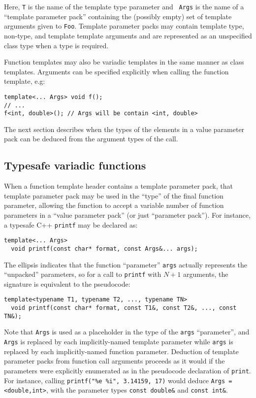 \documentclass{article}
\begin{document}
\noindent
Here, {\tt T} is the name of the template type parameter and {\tt
  Args} is the name of a ``template parameter pack'' containing the
(possibly empty) set of template arguments given to {\tt Foo}.
Template parameter packs may contain template type, non-type, and
template template arguments and are represented as an unspecified
class type when a type is required.

Function templates may also be variadic templates in the same manner
as class templates.  Arguments can be specified explicitly when
calling the function template, e.g:

\begin{verbatim}
template<... Args> void f();
// ... 
f<int, double>(); // Args will be contain <int, double>
\end{verbatim}
The next section describes when the types of the elements in 
a value parameter pack can be deduced from the argument types
of the call. 

\subsection{Typesafe variadic functions}
When a function template header contains a template parameter pack,
that template parameter pack may be used in the ``type'' of the final
function parameter, allowing the function to accept a variable number
of function parameters in a ``value parameter pack'' (or just
``parameter pack''). For instance, a typesafe C++ {\tt printf} may
be declared as:
\begin{verbatim}
template<... Args>
  void printf(const char* format, const Args&... args);
\end{verbatim}

\noindent The ellipsis indicates that the function ``parameter''
\texttt{args}
actually represents the ``unpacked'' parameters, so for a call to
\texttt{printf} with $N+1$ arguments, the signature is equivalent to
the pseudocode:

\begin{verbatim}
template<typename T1, typename T2, ..., typename TN>
  void printf(const char* format, const T1&, const T2&, ..., const TN&);
\end{verbatim}

\noindent 
Note that \texttt{Args} is used as a placeholder in the type of the
\texttt{args} ``parameter'', and \texttt{Args} is replaced by each
implicitly-named template parameter while \texttt{args} is replaced by
each implicitly-named function parameter. Deduction of template
parameter packs from function call arguments proceeds as it would if
the parameters were explicitly enumerated as in the pseudocode
declaration of \texttt{print}. For instance, calling
\texttt{printf("\%e \%i", 3.14159, 17)} would deduce \texttt{Args =
  <double,int>}, with the parameter types \texttt{const double\&} and
\texttt{const int\&}.
\end{document}

